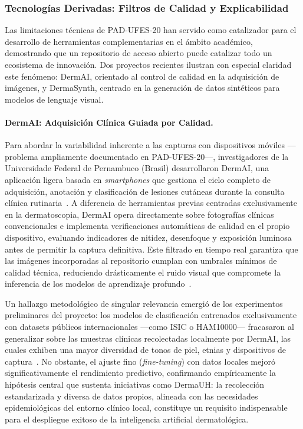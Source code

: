 \subsubsection{Tecnologías Derivadas: Filtros de Calidad y Explicabilidad}

Las limitaciones técnicas de PAD-UFES-20 han servido como catalizador para el desarrollo de herramientas 
complementarias en el ámbito académico, demostrando que un repositorio de acceso abierto puede catalizar 
todo un ecosistema de innovación. Dos proyectos recientes ilustran con especial claridad este fenómeno: 
DermAI, orientado al control de calidad en la adquisición de imágenes, y DermaSynth, centrado en la 
generación de datos sintéticos para modelos de lenguaje visual.

\paragraph{DermAI: Adquisición Clínica Guiada por Calidad.}
Para abordar la variabilidad inherente a las capturas con dispositivos móviles ---problema ampliamente 
documentado en PAD-UFES-20---, investigadores de la Universidade Federal de Pernambuco (Brasil) 
desarrollaron DermAI, una aplicación ligera basada en \textit{smartphones} que gestiona el ciclo completo 
de adquisición, anotación y clasificación de lesiones cutáneas durante la consulta clínica 
rutinaria~\cite{arxiv_dermai}. A diferencia de herramientas previas centradas exclusivamente en la 
dermatoscopia, DermAI opera directamente sobre fotografías clínicas convencionales e implementa 
verificaciones automáticas de calidad en el propio dispositivo, evaluando indicadores de nitidez, 
desenfoque y exposición luminosa antes de permitir la captura definitiva. Este filtrado en tiempo real 
garantiza que las imágenes incorporadas al repositorio cumplan con umbrales mínimos de calidad técnica, 
reduciendo drásticamente el ruido visual que compromete la inferencia de los modelos de aprendizaje 
profundo~\cite{arxiv_dermai}.

Un hallazgo metodológico de singular relevancia emergió de los experimentos preliminares del proyecto: los 
modelos de clasificación entrenados exclusivamente con datasets públicos internacionales ---como ISIC o 
HAM10000--- fracasaron al generalizar sobre las muestras clínicas recolectadas localmente por DermAI, las 
cuales exhiben una mayor diversidad de tonos de piel, etnias y dispositivos de 
captura~\cite{arxiv_dermai}. No obstante, el ajuste fino (\textit{fine-tuning}) con datos locales mejoró 
significativamente el rendimiento predictivo, confirmando empíricamente la hipótesis central que sustenta 
iniciativas como DermaUH: la recolección estandarizada y diversa de datos propios, alineada con las 
necesidades epidemiológicas del entorno clínico local, constituye un requisito indispensable para el 
despliegue exitoso de la inteligencia artificial dermatológica.

